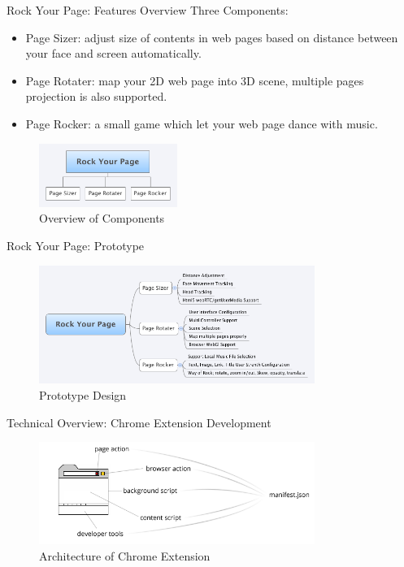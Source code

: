 \documentclass{beamer}
\begin{document}
\begin{frame}{Rock Your Page: Features Overview}
Three Components:
\begin{itemize}
    \item Page Sizer: adjust size of contents in web pages based on distance between your face and screen automatically.
    \item Page Rotater: map your 2D web page into 3D scene, multiple pages projection is also supported.
    \item Page Rocker: a small game which let your web page dance with music.
\end{itemize}
\begin{center}
    \begin{figure}
        \includegraphics[width=0.4\textwidth]{./images/Rock_Your_Page.png}
        \caption{Overview of Components}
\end{figure}
\end{center}
\end{frame}

\begin{frame}{Rock Your Page: Prototype}
    \begin{center}
        \begin{figure}
            \includegraphics[width=0.8\textwidth]{./images/prototype.png}
            \caption{Prototype Design}
        \end{figure}
    \end{center}
\end{frame}

\begin{frame}{Technical Overview: Chrome Extension Development}
    \begin{figure}
        \includegraphics[width=0.8\textwidth]{./images/architecture.png}
        \caption{Architecture of Chrome Extension}
    \end{figure}
\end{frame}
\end{document}
